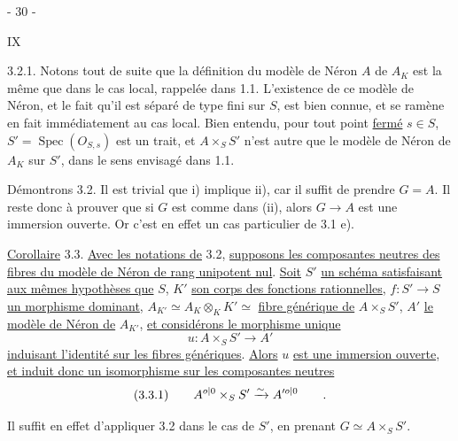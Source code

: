 \begin{center}- 30 -\end{center}\hfill IX

3.2.1. Notons tout de suite que la définition du modèle de Néron $A$
de $A_K$ est la même que dans le cas local, rappelée dans 1.1. L'existence
de ce modèle de Néron, et le fait qu'il est séparé de type fini sur $S$,
est bien connue, et se ramène en fait immédiatement au cas local.
Bien entendu, pour tout point \uline{fermé} $s\in S$, $S'=\operatorname{Spec}(O_{S,s})$ est un trait,
et $A\times_S S'$ n'est autre que le modèle de Néron de $A_K$ sur $S'$, dans le
sens envisagé dans 1.1.

Démontrons 3.2. Il est trivial que i) implique ii), car il
suffit de prendre $G=A$. Il reste donc à prouver que si $G$ est comme
dans (ii), alors $G\longrightarrow A$ est une immersion ouverte. Or c'est en effet
un cas particulier de 3.1 e).

\uline{Corollaire} 3.3. \uline{Avec les notations de} 3.2, \uline{supposons les composantes
neutres des fibres du modèle de Néron de rang unipotent nul}. \uline{Soit} $S'$
\uline{un schéma satisfaisant aux mêmes hypothèses que} $S$, $K'$ \uline{son corps des
fonctions rationnelles}, $f:S'\longrightarrow S$ \uline{un morphisme dominant},
$A_{K'}\simeq A_K\otimes_K K'\simeq$ \uline{fibre générique de} $A\times_S S'$, $A'$ \uline{le modèle de Néron de}
$A_{K'}$, \uline{et considérons le morphisme unique}
\[
 u:A\times_S S'\longrightarrow A'
\]
\uline{induisant l'identité sur les fibres génériques}. \uline{Alors} $u$ \uline{est une immersion
ouverte}, \uline{et induit donc un isomorphisme sur les composantes neutres}
\[
 (3.3.1)\qquad A^{{o|0}}\times_S S'\xrightarrow{\sim}A'^{{o|0}}\qquad.
\]

Il suffit en effet d'appliquer 3.2 dans le cas de $S'$, en
prenant $G\simeq A\times_S S'$.

